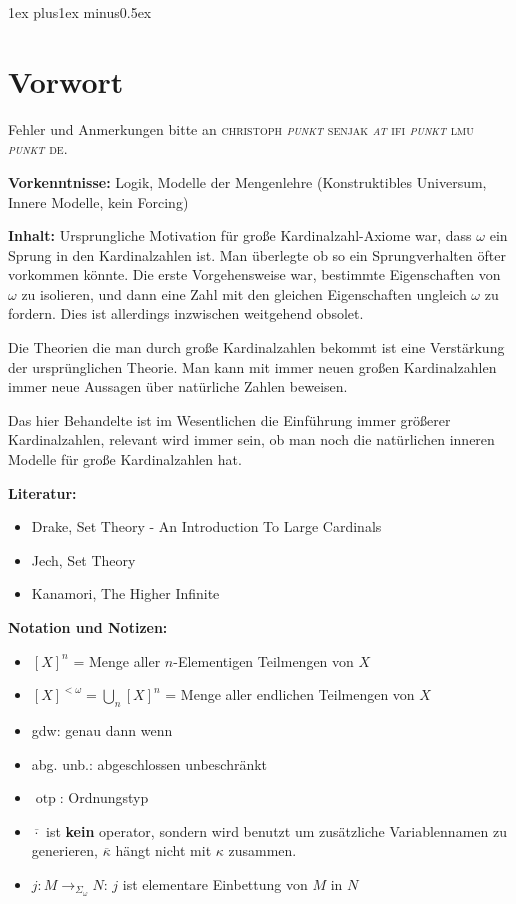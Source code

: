 \documentclass[a4paper,fontsize=11pt]{scrartcl}
\newcommand{\otp}{\operatorname{otp}}
\begin{document}
\flushleft
\parskip1ex plus1ex minus0.5ex
\section*{Vorwort}
Fehler und Anmerkungen bitte an \textsc{christoph {\it punkt} senjak {\it at} ifi {\it punkt} lmu {\it punkt} de}.

{\bf Vorkenntnisse:} Logik, Modelle der Mengenlehre (Konstruktibles
Universum, Innere Modelle, kein Forcing)

{\bf Inhalt:} Ursprungliche Motivation für große Kardinalzahl-Axiome war, dass $\omega$ ein Sprung in den Kardinalzahlen ist. Man überlegte ob so ein
Sprungverhalten öfter vorkommen könnte. Die erste Vorgehensweise war, bestimmte Eigenschaften von $\omega$ zu isolieren, und dann eine Zahl mit den
gleichen Eigenschaften ungleich $\omega$ zu fordern. Dies ist allerdings inzwischen weitgehend obsolet.

Die Theorien die man durch große Kardinalzahlen bekommt ist eine Verstärkung der ursprünglichen Theorie. Man kann mit immer neuen großen
Kardinalzahlen immer neue Aussagen über natürliche Zahlen beweisen.

Das hier Behandelte ist im Wesentlichen die Einführung immer größerer Kardinalzahlen, relevant wird immer sein, ob man noch die natürlichen inneren
Modelle für große Kardinalzahlen hat.

{\bf Literatur:}
\begin{itemize}
  \item Drake, Set Theory - An Introduction To Large Cardinals
  \item Jech, Set Theory
  \item Kanamori, The Higher Infinite
\end{itemize}

{\bf Notation und Notizen:}
\begin{itemize}
  \item $[X]^n$ = Menge aller $n$-Elementigen Teilmengen von $X$
  \item $[X]^{<\omega} = \bigcup_n[X]^n$ = Menge aller endlichen
    Teilmengen von $X$
  \item gdw: genau dann wenn
  \item abg. unb.: abgeschlossen unbeschränkt
  \item $\otp$: Ordnungstyp
  \item $\overline{\cdot}$ ist {\bf kein} operator, sondern wird
    benutzt um zusätzliche Variablennamen zu generieren,
    $\overline{\kappa}$ hängt nicht mit $\kappa$ zusammen.
  \item $j:M\rightarrow_{\Sigma_\omega} N$: $j$ ist elementare
    Einbettung von $M$ in $N$
\end{itemize}
\end{document}
